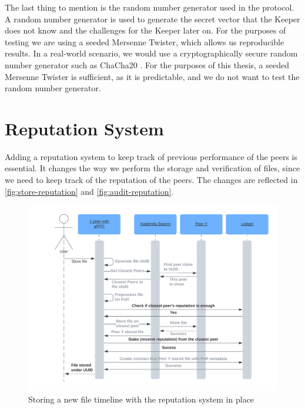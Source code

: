 The last thing to mention is the random number generator used in the protocol.
A random number generator is used to generate the secret vector that the Keeper does not know
and the challenges for the Keeper later on.
For the purposes of testing we are using a seeded Mersenne Twister, which allows us reproducible results.
In a real-world scenario, we would use a cryptographically secure random number generator
such as ChaCha20 \cite{chacha}.
For the purposes of this thesis, a seeded Mersenne Twister is sufficient,
as it is predictable, and we do not want to test the random number generator.

\section{Reputation System}
\label{section:reputation-system}

Adding a reputation system to keep track of previous performance of the peers is essential.
It changes the way we perform the storage and verification of files,
since we need to keep track of the reputation of the peers.
The changes are reflected in \autoref{fig:store-reputation} and \autoref{fig:audit-reputation}.

\begin{figure}
    \centering
    \includegraphics[width=1\textwidth]{gfx/store-reputation.png}
    \caption{Storing a new file timeline with the reputation system in place}
    \label{fig:store-reputation}
\end{figure}

